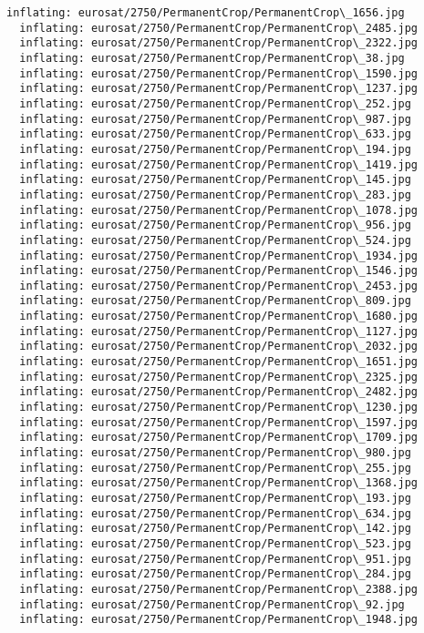 \documentclass[11pt]{article}
\begin{document}
\begin{Verbatim}[commandchars=\\\{\}]
  inflating: eurosat/2750/PermanentCrop/PermanentCrop\_1656.jpg
  inflating: eurosat/2750/PermanentCrop/PermanentCrop\_2485.jpg
  inflating: eurosat/2750/PermanentCrop/PermanentCrop\_2322.jpg
  inflating: eurosat/2750/PermanentCrop/PermanentCrop\_38.jpg
  inflating: eurosat/2750/PermanentCrop/PermanentCrop\_1590.jpg
  inflating: eurosat/2750/PermanentCrop/PermanentCrop\_1237.jpg
  inflating: eurosat/2750/PermanentCrop/PermanentCrop\_252.jpg
  inflating: eurosat/2750/PermanentCrop/PermanentCrop\_987.jpg
  inflating: eurosat/2750/PermanentCrop/PermanentCrop\_633.jpg
  inflating: eurosat/2750/PermanentCrop/PermanentCrop\_194.jpg
  inflating: eurosat/2750/PermanentCrop/PermanentCrop\_1419.jpg
  inflating: eurosat/2750/PermanentCrop/PermanentCrop\_145.jpg
  inflating: eurosat/2750/PermanentCrop/PermanentCrop\_283.jpg
  inflating: eurosat/2750/PermanentCrop/PermanentCrop\_1078.jpg
  inflating: eurosat/2750/PermanentCrop/PermanentCrop\_956.jpg
  inflating: eurosat/2750/PermanentCrop/PermanentCrop\_524.jpg
  inflating: eurosat/2750/PermanentCrop/PermanentCrop\_1934.jpg
  inflating: eurosat/2750/PermanentCrop/PermanentCrop\_1546.jpg
  inflating: eurosat/2750/PermanentCrop/PermanentCrop\_2453.jpg
  inflating: eurosat/2750/PermanentCrop/PermanentCrop\_809.jpg
  inflating: eurosat/2750/PermanentCrop/PermanentCrop\_1680.jpg
  inflating: eurosat/2750/PermanentCrop/PermanentCrop\_1127.jpg
  inflating: eurosat/2750/PermanentCrop/PermanentCrop\_2032.jpg
  inflating: eurosat/2750/PermanentCrop/PermanentCrop\_1651.jpg
  inflating: eurosat/2750/PermanentCrop/PermanentCrop\_2325.jpg
  inflating: eurosat/2750/PermanentCrop/PermanentCrop\_2482.jpg
  inflating: eurosat/2750/PermanentCrop/PermanentCrop\_1230.jpg
  inflating: eurosat/2750/PermanentCrop/PermanentCrop\_1597.jpg
  inflating: eurosat/2750/PermanentCrop/PermanentCrop\_1709.jpg
  inflating: eurosat/2750/PermanentCrop/PermanentCrop\_980.jpg
  inflating: eurosat/2750/PermanentCrop/PermanentCrop\_255.jpg
  inflating: eurosat/2750/PermanentCrop/PermanentCrop\_1368.jpg
  inflating: eurosat/2750/PermanentCrop/PermanentCrop\_193.jpg
  inflating: eurosat/2750/PermanentCrop/PermanentCrop\_634.jpg
  inflating: eurosat/2750/PermanentCrop/PermanentCrop\_142.jpg
  inflating: eurosat/2750/PermanentCrop/PermanentCrop\_523.jpg
  inflating: eurosat/2750/PermanentCrop/PermanentCrop\_951.jpg
  inflating: eurosat/2750/PermanentCrop/PermanentCrop\_284.jpg
  inflating: eurosat/2750/PermanentCrop/PermanentCrop\_2388.jpg
  inflating: eurosat/2750/PermanentCrop/PermanentCrop\_92.jpg
  inflating: eurosat/2750/PermanentCrop/PermanentCrop\_1948.jpg

\end{Verbatim}
\end{document}
